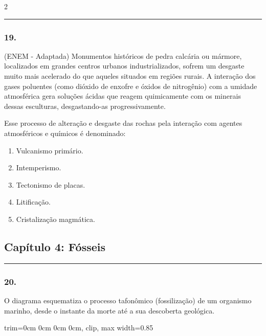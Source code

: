 \documentclass[twoside, 10pt, a4paper]{article}
\newlength{\espacoPosTitulo}
\newlength{\espacoPreQuestao}
\newlength{\espacoQuestao}
\newlength{\espacoAlt}
\newcommand{\larguraTikz}{0.85\linewidth}
\begin{document}
\begin{multicols*}{2}
\noindent\textcolor{CorLinha}{\rule{\linewidth}{0.5pt}} 
\par\vspace{\espacoPreQuestao}
\subsubsection*{19.} (ENEM - Adaptada) Monumentos históricos de pedra calcária ou mármore, localizados em grandes centros urbanos industrializados, sofrem um desgaste muito mais acelerado do que aqueles situados em regiões rurais. A interação dos gases poluentes (como dióxido de enxofre e óxidos de nitrogênio) com a umidade atmosférica gera soluções ácidas que reagem quimicamente com os minerais dessas esculturas, desgastando-as progressivamente.

Esse processo de alteração e desgaste das rochas pela interação com agentes atmosféricos e químicos é denominado:

\begin{enumerate}[label=\alph*), itemsep=\espacoAlt]
\item Vulcanismo primário.
\item Intemperismo.
\item Tectonismo de placas.
\item Litificação.
\item Cristalização magmática.
\end{enumerate}
\par\vspace{\espacoQuestao}

\subsection*{Capítulo 4: Fósseis}
\vspace{-0.2cm}\noindent\rule{\linewidth}{1.5pt} 
\par\vspace{\espacoPosTitulo}
\subsubsection*{20.} O diagrama esquematiza o processo tafonômico (fossilização) de um organismo marinho, desde o instante da morte até a sua descoberta geológica.

\begin{center}
\begin{adjustbox}{trim=0cm 0cm 0cm 0cm, clip, max width=\larguraTikz}
\end{adjustbox}
\end{center}
\end{multicols*}
\end{document}
